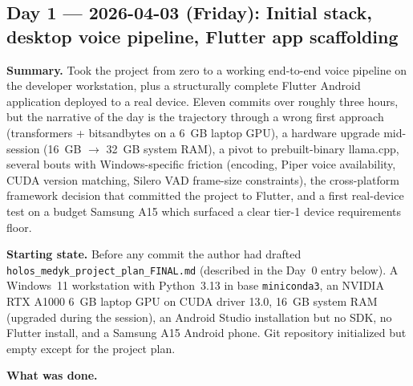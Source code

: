 \documentclass{article}
\theoremstyle{plain}
\theoremstyle{definition}
\theoremstyle{remark}
\begin{document}
\subsection*{Day 1 --- 2026-04-03 (Friday): Initial stack, desktop voice pipeline, Flutter app scaffolding}

\textbf{Summary.} Took the project from zero to a working end-to-end voice pipeline on the developer workstation, plus a structurally complete Flutter Android application deployed to a real device. Eleven commits over roughly three hours, but the narrative of the day is the trajectory through a wrong first approach (transformers + bitsandbytes on a 6~GB laptop GPU), a hardware upgrade mid-session (16~GB $\rightarrow$ 32~GB system RAM), a pivot to prebuilt-binary llama.cpp, several bouts with Windows-specific friction (encoding, Piper voice availability, CUDA version matching, Silero VAD frame-size constraints), the cross-platform framework decision that committed the project to Flutter, and a first real-device test on a budget Samsung A15 which surfaced a clear tier-1 device requirements floor.

\textbf{Starting state.} Before any commit the author had drafted \texttt{holos\_medyk\_project\_plan\_FINAL.md} (described in the Day~0 entry below). A Windows~11 workstation with Python~3.13 in base \texttt{miniconda3}, an NVIDIA RTX A1000 6~GB laptop GPU on CUDA driver 13.0, 16~GB system RAM (upgraded during the session), an Android Studio installation but no SDK, no Flutter install, and a Samsung A15 Android phone. Git repository initialized but empty except for the project plan.

\textbf{What was done.}
\end{document}
